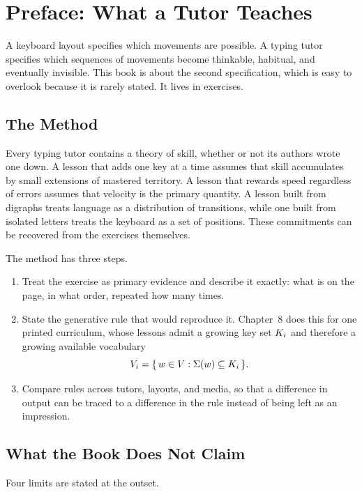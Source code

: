 \chapter*{Preface: What a Tutor Teaches}

A keyboard layout specifies which movements are possible. A typing tutor specifies which sequences of movements become thinkable, habitual, and eventually invisible. This book is about the second specification, which is easy to overlook because it is rarely stated. It lives in exercises.

\section*{The Method}

Every typing tutor contains a theory of skill, whether or not its authors wrote one down. A lesson that adds one key at a time assumes that skill accumulates by small extensions of mastered territory. A lesson that rewards speed regardless of errors assumes that velocity is the primary quantity. A lesson built from digraphs treats language as a distribution of transitions, while one built from isolated letters treats the keyboard as a set of positions. These commitments can be recovered from the exercises themselves.

The method has three steps.

\begin{enumerate}
\item Treat the exercise as primary evidence and describe it exactly: what is on the page, in what order, repeated how many times.
\item State the generative rule that would reproduce it. Chapter~8 does this for one printed curriculum, whose lessons admit a growing key set $K_i$ and therefore a growing available vocabulary
\[
V_i=\{\,w\in V:\Sigma(w)\subseteq K_i\,\}.
\]
\item Compare rules across tutors, layouts, and media, so that a difference in output can be traced to a difference in the rule instead of being left as an impression.
\end{enumerate}

\section*{What the Book Does Not Claim}

Four limits are stated at the outset.

